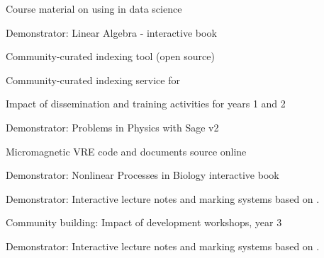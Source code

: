 \begin{workpackage}
\begin{wpdelivs}
      \begin{wpdeliv}[due=24,miles=proto1,id=datascience-course,dissem=PU,nature=DEC,lead=USH]{Course material on using \TheProject in data science} \end{wpdeliv}
 \begin{wpdeliv}[due=24,miles=proto1,id=ibook2,dissem=PU,nature=DEM,lead=US]{Demonstrator: Linear Algebra -  interactive book} \end{wpdeliv}
 \begin{wpdeliv}[due=24,miles=proto1,id=ils-tool,dissem=PU,nature=P,lead=UV]{Community-curated
     indexing tool (open source)} \end{wpdeliv}
 \begin{wpdeliv}[due=24,miles=proto1,id=ils-service,dissem=PU,nature=DEM,lead=UV]{Community-curated
     indexing service for \TheProject} \end{wpdeliv}
  \begin{wpdeliv}[due=24,miles=proto1,id=dissem-1,dissem=PU,nature=R,lead=PS]{Impact of dissemination and training activities for years 1 and 2}\end{wpdeliv}
   \begin{wpdeliv}[due=30,miles=community,id=ibook3b,dissem=PU,nature=DEM,lead=US]{Demonstrator: Problems in Physics with Sage v2} \end{wpdeliv}
   \begin{wpdeliv}[due=32,id=oommfnb-source-and-testing-setup,dissem=PU,nature=DEC,lead=USO]{Micromagnetic
     VRE code and documents source online} \end{wpdeliv}
 \begin{wpdeliv}[due=36,id=ibook1,miles=community,dissem=PU,nature=DEM,lead=US]{Demonstrator: Nonlinear Processes in Biology  interactive book} \end{wpdeliv}
 \begin{wpdeliv}[due=36,id=lecture-notes,miles=community,dissem=PU,nature=DEM,lead=USH]{Demonstrator:
     Interactive lecture notes and marking systems based on
     \TheProject.}\end{wpdeliv}
 \begin{wpdeliv}[due=36,id=workshops-3,dissem=PU,miles=community,nature=R,lead=PS]{Community building: Impact of development workshops, year 3}\end{wpdeliv}
  \begin{wpdeliv}[due=36,id=lecture-notes,dissem=PU,nature=DEM,lead=USH]{Demonstrator: Interactive lecture notes and marking systems based on \TheProject.}\end{wpdeliv}

\end{wpdelivs}
\end{workpackage}

